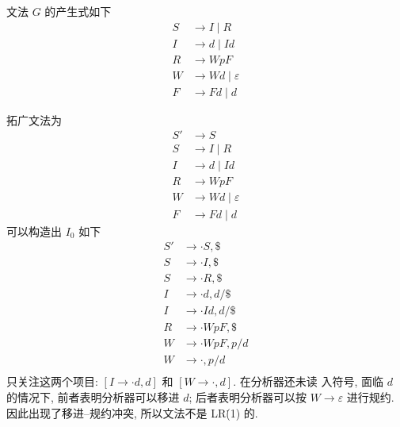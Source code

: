 \documentclass[boxes]{homework}
\begin{document}
\begin{problem}
文法 $G$ 的产生式如下
\begin{equation}
    \begin{aligned}
        S & \to I \mid R            \\
        I & \to d \mid  Id          \\
        R & \to WpF                 \\
        W & \to Wd \mid \varepsilon \\
        F & \to Fd \mid d
    \end{aligned}
\end{equation}
\end{problem}
\begin{solution}
    拓广文法为
    \begin{equation}
        \begin{aligned}
            S' & \to S                   \\
            S  & \to I \mid R            \\
            I  & \to d \mid  Id          \\
            R  & \to WpF                 \\
            W  & \to Wd \mid \varepsilon \\
            F  & \to Fd \mid d
        \end{aligned}
    \end{equation}
    可以构造出 $I_{0}$ 如下
    \begin{equation}
        \begin{aligned}
            S' & \to \cdot S, \$       \\
            S  & \to \cdot I, \$       \\
            S  & \to \cdot R, \$       \\
            I  & \to \cdot d, d / \$   \\
            I  & \to \cdot I d, d / \$ \\
            R  & \to \cdot W p F, \$   \\
            W  & \to \cdot WpF, p / d  \\
            W  & \to \cdot , p / d     \\
        \end{aligned}
    \end{equation}
    只关注这两个项目: $[I \to \cdot d, d]$ 和 $[W \to \cdot, d]$. 在分析器还未读
    入符号, 面临 $d$ 的情况下, 前者表明分析器可以移进 $d$; 后者表明分析器可以按
    $W\to \varepsilon$ 进行规约. 因此出现了移进--规约冲突, 所以文法不是 LR\.(1)
    的.
\end{solution}
\end{document}
